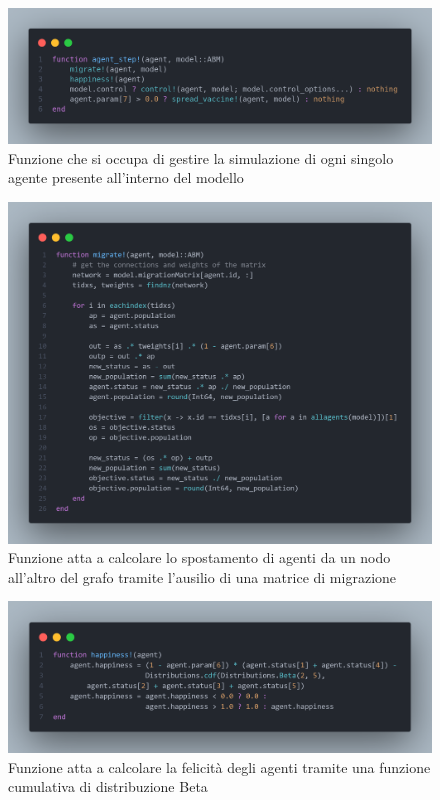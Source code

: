 \begin{figure}[H]
    \begin{center}
		\includegraphics[width=\textwidth]{img/agent_step.png}
		\caption{Funzione che si occupa di gestire la simulazione di ogni singolo agente presente all'interno del modello}
		\label{fig:agent_step}
	\end{center}
\end{figure}

\begin{figure}[H]
    \begin{center}
		\includegraphics[width=\textwidth]{img/migratef.png}
		\caption{Funzione atta a calcolare lo spostamento di agenti da un nodo all'altro del grafo tramite l'ausilio di una matrice di migrazione}
		\label{fig:migrationf}
	\end{center}
\end{figure}

\begin{figure}[H]
    \begin{center}
		\includegraphics[width=\textwidth]{img/happiness.png}
		\caption{Funzione atta a calcolare la felicità degli agenti tramite una funzione cumulativa di distribuzione Beta}
		\label{fig:happinessf}
	\end{center}
\end{figure}

